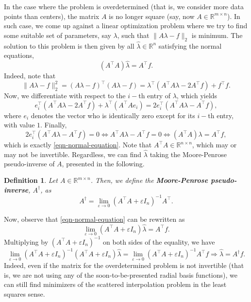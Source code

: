 \documentclass[12pt]{report} %
\newtheorem{definition}{Definition}
\newcommand{\tmstrong}[1]{\textbf{#1}}
\begin{document}
In the case where the problem is overdetermined (that is, we consider more data
points than centers), the matrix $A$ is no longer square (say, now $A \in
\mathbb{R}^{m \times n}$). In such case, we come up against a linear optimization
problem where we try to find some suitable set of parameters, say $\lambda$,
such that $\| A \lambda - f \|_2$ is minimum. The solution to this problem is
then given by all $\hat{\lambda} \in \mathbb{R}^n$ satisfying the normal
equations,
\begin{equation}
  (A^{\top} A) \hat{\lambda} = A^{\top} f \label{eqn-normal-equation} .
\end{equation}
Indeed, note that
\[ \| A \lambda - f \|_2^2 = (A \lambda - f)^{\top} (A \lambda - f) =
   \lambda^{\top} (A^{\top} A \lambda - 2 A^{\top} f) + f^{\top} f. \]
Now, we differentiate with respect to the $i -$th entry of $\lambda$, which
yields
\[ e_i^{\top} (A^{\top} A \lambda - 2 A^{\top} f) + \lambda^{\top} (A^{\top} A
   e_i) = 2 e_i^{\top} (A^{\top} A \lambda - A^{\top} f), \]
where $e_i$ denotes the vector who is identically zero except for its $i -$th
entry, with value $1$. Finally,
\[ 2 e_i^{\top} (A^{\top} A \lambda - A^{\top} f) = 0 \Leftrightarrow
   A^{\top} A \lambda - A^{\top} f = 0 \Leftrightarrow (A^{\top} A) \lambda =
   A^{\top} f, \]
which is exactly \eqref{eqn-normal-equation}. Note that $A^{\top} A \in
\mathbb{R}^{n \times n}$, which may or may not be invertible. Regardless, we
can find $\hat{\lambda}$ taking the Moore-Penrose pseudo-inverse of $A$,
presented in the following.

\begin{definition}
  Let $A \in \mathbb{R}^{m \times n}$. Then, we define the
  {\tmstrong{Moore-Penrose pseudo-inverse}}, $A^{\dag}$, as
  \[ A^{\dag} = \lim_{\varepsilon \rightarrow 0} (A^{\top} A + \varepsilon
     I_n)^{- 1} A^{\top} . \]
\end{definition}

Now, observe that \eqref{eqn-normal-equation} can be rewritten as
\[ \lim_{\varepsilon \rightarrow 0} (A^{\top} A + \varepsilon I_n)
   \hat{\lambda} = A^{\top} f. \]
Multiplying by $(A^{\top} A + \varepsilon I_n)^{- 1}$ on both sides of the
equality, we have
\[ \lim_{\varepsilon \rightarrow 0} (A^{\top} A + \varepsilon I_n)^{- 1}
   (A^{\top} A + \varepsilon I_n) \hat{\lambda} = \lim_{\varepsilon
   \rightarrow 0} (A^{\top} A + \varepsilon I_n)^{- 1} A^{\top} f \Rightarrow
   \hat{\lambda} = A^{\dag} f. \]
Indeed, even if the matrix for the overdetermined problem is not invertible
(that is, we are not using any of the soon-to-be-presented radial basis
functions), we can still find minimizers of the scattered interpolation
problem in the least squares sense.
\end{document}
